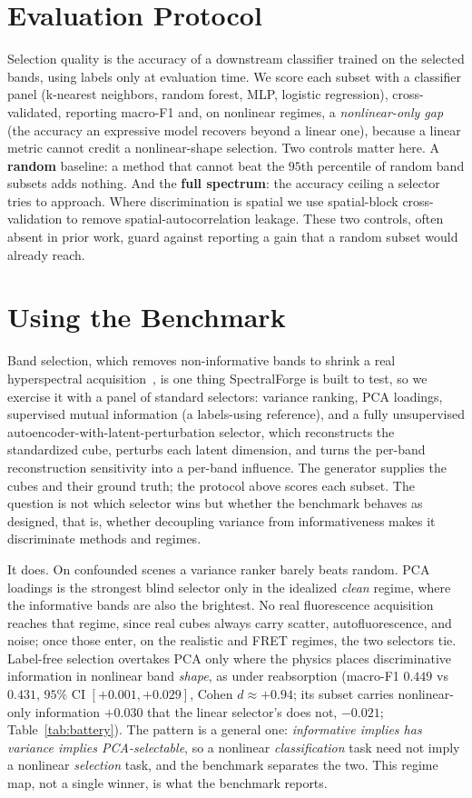 \documentclass[conference]{IEEEtran}
\begin{document}
\section{Evaluation Protocol}
Selection quality is the accuracy of a downstream classifier trained on the selected
bands, using labels only at evaluation time. We score each subset with a classifier
panel (k-nearest neighbors, random forest, MLP, logistic regression), cross-validated,
reporting macro-F1 and, on nonlinear regimes, a \emph{nonlinear-only gap} (the accuracy
an expressive model recovers beyond a linear one), because a linear metric cannot credit
a nonlinear-shape selection. Two controls matter here. A \textbf{random}
baseline: a method that cannot beat the $95$th percentile of random band subsets adds
nothing. And the \textbf{full spectrum}: the accuracy ceiling a selector tries to
approach. Where
discrimination is spatial we use spatial-block cross-validation to remove
spatial-autocorrelation leakage. These two controls, often absent in prior work, guard
against reporting a gain that a random subset would already reach.

\section{Using the Benchmark}
Band selection, which removes non-informative bands to shrink a real hyperspectral
acquisition~\cite{ref_guan,ref_scirep}, is one thing SpectralForge is built to test, so we exercise it with a
panel of standard selectors: variance ranking, PCA loadings, supervised mutual information (a
labels-using reference), and a fully unsupervised autoencoder-with-latent-perturbation
selector, which reconstructs the standardized cube, perturbs each latent dimension, and
turns the per-band reconstruction sensitivity into a per-band influence. The generator
supplies the cubes and their ground truth; the protocol above scores each subset. The
question is not which selector wins but whether the benchmark behaves as designed, that
is, whether decoupling variance from informativeness makes it discriminate methods and
regimes.

It does. On confounded scenes a variance ranker barely beats random. PCA loadings is the
strongest blind selector only in the idealized \emph{clean} regime, where the informative
bands are also the brightest. No real fluorescence acquisition reaches that regime, since
real cubes always carry scatter, autofluorescence, and noise; once those enter, on the
realistic and FRET regimes, the two selectors tie. Label-free selection overtakes PCA only
where the physics places discriminative information in nonlinear band \emph{shape}, as under
reabsorption (macro-F1 $0.449$ vs $0.431$, $95\%$ CI $[+0.001,+0.029]$, Cohen
$d\approx+0.94$; its subset carries nonlinear-only information $+0.030$ that the linear
selector's does not, $-0.021$; Table~\ref{tab:battery}). The pattern is a general one:
\emph{informative implies has variance implies PCA-selectable}, so a nonlinear
\emph{classification} task need not imply a nonlinear \emph{selection} task, and the
benchmark separates the two. This regime map, not a single winner, is what the benchmark
reports.
\end{document}
